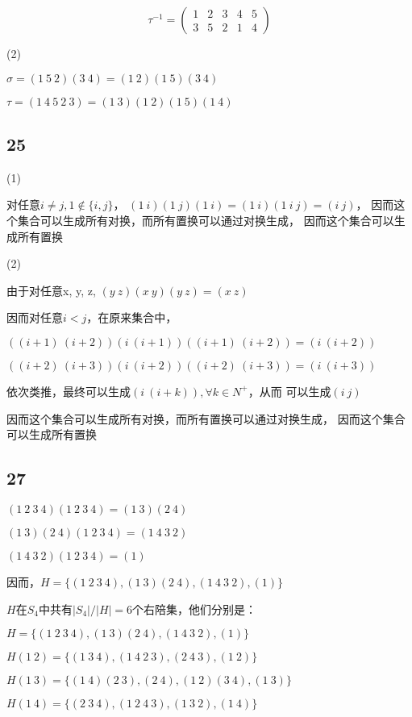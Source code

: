 \documentclass[UTF8]{ctexart}
\begin{document}
\[
\tau^{-1} = 
\begin{pmatrix}
    1 &2 &3 &4 &5\\
    3 &5 &2 &1 &4
\end{pmatrix}
\]

(2)

$\sigma = (1\ 5\ 2)(3\ 4) = (1\ 2)(1\ 5)(3\ 4)$

$\tau = (1\ 4\ 5\ 2\ 3) = (1\ 3)(1\ 2)(1\ 5)(1\ 4)$

\subsection*{25}

(1)

对任意$i\neq j, 1\notin\{i, j\}$，
$(1\ i)(1\ j)(1\ i) = (1\ i)(1\ i\ j) = (i\ j)$，
因而这个集合可以生成所有对换，而所有置换可以通过对换生成，
因而这个集合可以生成所有置换

(2)

由于对任意x, y, z, $(y\ z)(x\ y)(y\ z) = (x\ z)$

因而对任意$i < j$，在原来集合中，

$((i+1)\ (i+2))(i\ (i+1))((i+1)\ (i+2)) = (i\ (i+2))$

$((i+2)\ (i+3))(i\ (i+2))((i+2)\ (i+3)) = (i\ (i+3))$

依次类推，最终可以生成$(i\ (i+k)), \forall k\in N^+$，从而
可以生成$(i\ j)$

因而这个集合可以生成所有对换，而所有置换可以通过对换生成，
因而这个集合可以生成所有置换

\subsection*{27}

$(1\ 2\ 3\ 4)(1\ 2\ 3\ 4) = (1\ 3)(2\ 4)$

$(1\ 3)(2\ 4)(1\ 2\ 3\ 4) = (1\ 4\ 3\ 2)$

$(1\ 4\ 3\ 2)(1\ 2\ 3\ 4) = (1)$

因而，$H = \{(1\ 2\ 3\ 4), (1\ 3)(2\ 4), (1\ 4\ 3\ 2), (1)\}$

$H$在$S_4$中共有$|S_4| / |H| = 6$个右陪集，他们分别是：

$H = \{(1\ 2\ 3\ 4), (1\ 3)(2\ 4), (1\ 4\ 3\ 2), (1)\}$

$H(1\ 2) = \{(1\ 3\ 4), (1\ 4\ 2\ 3), (2\ 4\ 3), (1\ 2)\}$

$H(1\ 3) = \{(1\ 4)(2\ 3), (2\ 4), (1\ 2)(3\ 4), (1\ 3)\}$

$H(1\ 4) = \{(2\ 3\ 4), (1\ 2\ 4\ 3), (1\ 3\ 2), (1\ 4)\}$
\end{document}
